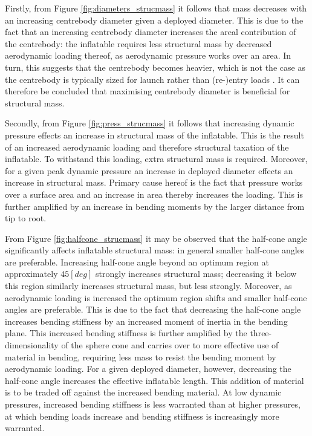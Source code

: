 Firstly, from Figure \ref{fig:diameters_strucmass} it follows that mass decreases with an increasing centrebody diameter given a deployed diameter. This is due to the fact that an increasing centrebody diameter increases the areal contribution of the centrebody: the inflatable requires less structural mass by decreased aerodynamic loading thereof, as aerodynamic pressure works over an area. In turn, this suggests that the centrebody becomes heavier, which is not the case as the centrebody is typically sized for launch rather than (re-)entry loads \cite{Lindell2006}. It can therefore be concluded that maximising centrebody diameter is beneficial for structural mass. 

Secondly, from Figure \ref{fig:press_strucmass} it follows that increasing dynamic pressure effects an increase in structural mass of the inflatable. This is the result of an increased aerodynamic loading and therefore structural taxation of the inflatable. To withstand this loading, extra structural mass is required. Moreover, for a given peak dynamic pressure an increase in deployed diameter effects an increase in structural mass. Primary cause hereof is the fact that pressure works over a surface area and an increase in area thereby increases the loading. This is further amplified by an increase in bending moments by the larger distance from tip to root.

From Figure \ref{fig:halfcone_strucmass} it may be observed that the half-cone angle significantly affects inflatable structural mass: in general smaller half-cone angles are preferable. Increasing half-cone angle beyond an optimum region at approximately $45 \left[deg\right]$ strongly increases structural mass; decreasing it below this region similarly increases structural mass, but less strongly. Moreover, as aerodynamic loading is increased the optimum region shifts and smaller half-cone angles are preferable. This is due to the fact that decreasing the half-cone angle increases bending stiffness by an increased moment of inertia in the bending plane. This increased bending stiffness is further amplified by the three-dimensionality of the sphere cone and carries over to more effective use of material in bending, requiring less mass to resist the bending moment by aerodynamic loading. For a given deployed diameter, however, decreasing the half-cone angle increases the effective inflatable length. This addition of material is to be traded off against the increased bending material. At low dynamic pressures, increased bending stiffness is less warranted than at higher pressures, at which bending loads increase and bending stiffness is increasingly more warranted.

